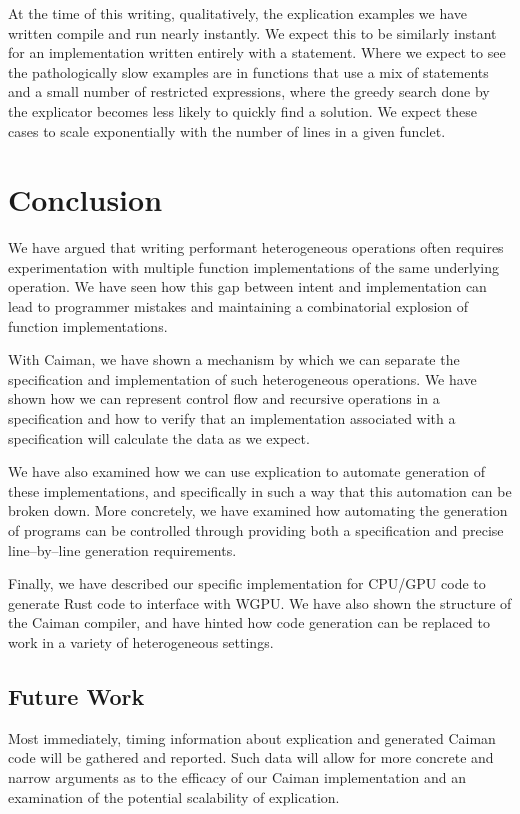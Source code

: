 At the time of this writing, qualitatively, the explication examples we have written compile and run nearly instantly.  We expect this to be similarly instant for an implementation written entirely with a  statement.  Where we expect to see the pathologically slow examples are in functions that use a mix of  statements and a small number of restricted expressions, where the greedy search done by the explicator becomes less likely to quickly find a solution.  We expect these cases to scale exponentially with the number of lines in a given funclet.

\section{Conclusion}
\label{sec:conclusion}

We have argued that writing performant heterogeneous operations often requires experimentation with multiple function implementations of the same underlying operation.  We have seen how this gap between intent and implementation can lead to programmer mistakes and maintaining a combinatorial explosion of function implementations.

With Caiman, we have shown a mechanism by which we can separate the specification and implementation of such heterogeneous operations.  We have shown how we can represent control flow and recursive operations in a specification and how to verify that an implementation associated with a specification will calculate the data as we expect.

We have also examined how we can use explication to automate generation of these implementations, and specifically in such a way that this automation can be broken down.  More concretely, we have examined how automating the generation of programs can be controlled through providing both a specification and precise line--by--line generation requirements.

Finally, we have described our specific implementation for CPU/GPU code to generate Rust code to interface with WGPU.  We have also shown the structure of the Caiman compiler, and have hinted how code generation can be replaced to work in a variety of heterogeneous settings.

\subsection{Future Work}
\label{subsec:future}

Most immediately, timing information about explication and generated Caiman code will be gathered and reported.  Such data will allow for more concrete and narrow arguments as to the efficacy of our Caiman implementation and an examination of the potential scalability of explication.

